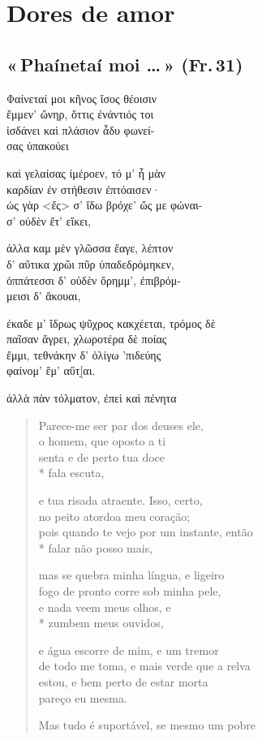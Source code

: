 \chapter{Dores de amor}

\section[«\,Phaínetaí moi \ldots{}\,» (Fr.\,31)]{«\,Phaínetaí moi \ldots{}\,» (Fr.\,31)}

\begin{gkverse}
Φαίνεταί μοι κῆνος ἴσος θέοισιν\\
ἔμμεν’ ὤνηρ, ὄττις ἐνάντιός τοι\\
ἰσδάνει καὶ πλάσιον ἆδυ φωνεί-\\
σας ὐπακούει

καὶ γελαίσας ἰμέροεν, τό μ’ ἦ μὰν\\
καρδίαν ἐν στήθεσιν ἐπτόαισεν·\\
ὠς γὰρ <ἔς> σ’ ἴδω βρόχε’ ὤς με φώναι-\\
σ’ οὐδὲν ἔτ’ εἴκει,

ἀλλα \dagger{}καμ\dagger{} μὲν γλῶσσα \dagger{}ἔαγε\dagger{}, λέπτον\\
δ’ αὔτικα χρῶι πῦρ ὐπαδεδρόμηκεν,\\
ὀππάτεσσι δ’ οὐδὲν ὄρημμ’, ἐπιβρόμ-\\
μεισι δ’ ἄκουαι,

\dagger{}έκαδε\dagger{} μ’ ἴδρως ψῦχρος κακχέεται, τρόμος δὲ\\
παῖσαν ἄγρει, χλωροτέρα δὲ ποίας\\
ἔμμι, τεθνάκην δ’ ὀλίγω ’πιδεύης\\
φαίνομ’ ἔμ’ αὔτ[̣αι.

ἀλλὰ πὰν τόλματον, ἐπεὶ \dagger{}καὶ πένητα\dagger{}
\end{gkverse}

\pagebreak
\begin{verse}
Parece-me ser par dos deuses ele,\\
o homem, que oposto a ti\\
senta e de perto tua doce\\*
fala escuta,

e tua risada atraente. Isso, certo,\\
no peito atordoa meu coração;\\
pois quando te vejo por um instante, então\\*
falar não posso mais,

mas se quebra minha língua, e ligeiro\\
fogo de pronto corre sob minha pele,\\
e nada veem meus olhos, e\\*
zumbem meus ouvidos,

e água escorre de mim, e um tremor\\
de todo me toma, e mais verde que a relva\\
estou, e bem perto de estar morta\\
pareço eu mesma.

Mas tudo é suportável, se mesmo um pobre 
\end{verse}


